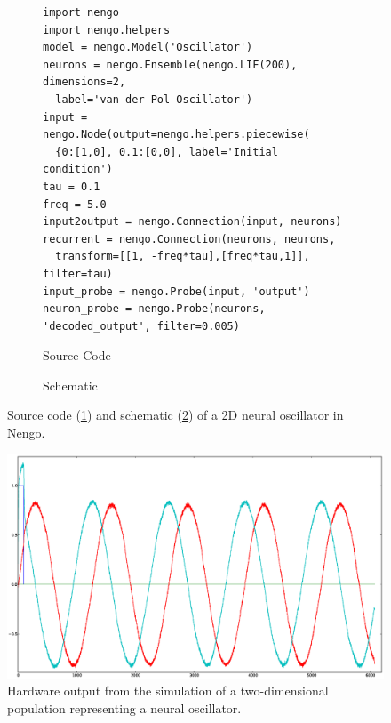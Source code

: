 \documentclass[english]{article}
\begin{document}
\begin{figure}
\centering

\begin{subfigure}[b]{\textwidth}
\centering
\lstset{language=Python}
\begin{lstlisting}[frame=single]
import nengo
import nengo.helpers
model = nengo.Model('Oscillator')
neurons = nengo.Ensemble(nengo.LIF(200), dimensions=2, 
  label='van der Pol Oscillator')
input = nengo.Node(output=nengo.helpers.piecewise(
  {0:[1,0], 0.1:[0,0], label='Initial condition')
tau = 0.1
freq = 5.0
input2output = nengo.Connection(input, neurons)
recurrent = nengo.Connection(neurons, neurons, 
  transform=[[1, -freq*tau],[freq*tau,1]], filter=tau)
input_probe = nengo.Probe(input, 'output')
neuron_probe = nengo.Probe(neurons, 'decoded_output', filter=0.005)
\end{lstlisting}
\caption{Source Code}
\label{lst:oscillator2d:code}
\end{subfigure}

\begin{subfigure}[b]{0.3\textwidth}
\centering
\caption{Schematic}
\label{lst:oscillator2d:schematic}
\end{subfigure}

\caption[A 2D neural oscillator in Nengo.]
{Source code (\ref{lst:oscillator2d:code}) and schematic (\ref{lst:oscillator2d:schematic})
of a 2D neural oscillator in Nengo.}
\label{lst:oscillator2d}
\end{figure}

\begin{figure}
\centering
\includegraphics[width=6in]{oscillator-2d.eps}

\caption[Simulation of a 2D neural oscillator.]
{Hardware output from the simulation of a two-dimensional population representing a neural oscillator.}
\label{fig:oscillator2d}
\end{figure}
\end{document}
